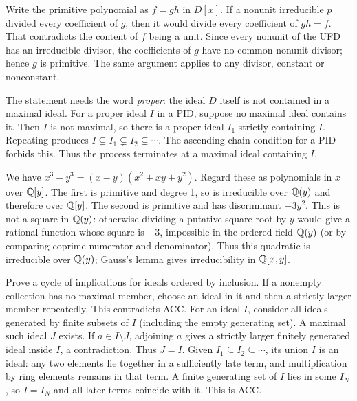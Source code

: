 Write the primitive polynomial as $f=gh$ in $D[x]$. If a nonunit irreducible $p$ divided every coefficient of $g$, then it would divide every coefficient of $gh=f$. That contradicts the content of $f$ being a unit. Since every nonunit of the UFD has an irreducible divisor, the coefficients of $g$ have no common nonunit divisor; hence $g$ is primitive. The same argument applies to any divisor, constant or nonconstant.

The statement needs the word \emph{proper}: the ideal $D$ itself is not contained in a maximal ideal. For a proper ideal $I$ in a PID, suppose no maximal ideal contains it. Then $I$ is not maximal, so there is a proper ideal $I_1$ strictly containing $I$. Repeating produces $I\subsetneq I_1\subsetneq I_2\subsetneq\cdots$. The ascending chain condition for a PID forbids this. Thus the process terminates at a maximal ideal containing $I$.

We have $x^3-y^3=(x-y)(x^2+xy+y^2)$. Regard these as polynomials in $x$ over $\mathbb{Q}[y]$. The first is primitive and degree 1, so is irreducible over $\mathbb{Q}(y)$ and therefore over $\mathbb{Q}[y]$. The second is primitive and has discriminant $-3y^2$. This is not a square in $\mathbb{Q}(y)$: otherwise dividing a putative square root by $y$ would give a rational function whose square is $-3$, impossible in the ordered field $\mathbb{Q}(y)$ (or by comparing coprime numerator and denominator). Thus this quadratic is irreducible over $\mathbb{Q}(y)$; Gauss's lemma gives irreducibility in $\mathbb{Q}[x,y]$.

\idea Prove a cycle of implications for ideals ordered by inclusion.
 If a nonempty collection has no maximal member, choose an ideal in it and then a strictly larger member repeatedly. This contradicts ACC.
 For an ideal $I$, consider all ideals generated by finite subsets of $I$ (including the empty generating set). A maximal such ideal $J$ exists. If $a\in I\setminus J$, adjoining $a$ gives a strictly larger finitely generated ideal inside $I$, a contradiction. Thus $J=I$.
 Given $I_1\subseteq I_2\subseteq\cdots$, its union $I$ is an ideal: any two elements lie together in a sufficiently late term, and multiplication by ring elements remains in that term. A finite generating set of $I$ lies in some $I_N$, so $I=I_N$ and all later terms coincide with it. This is ACC.

